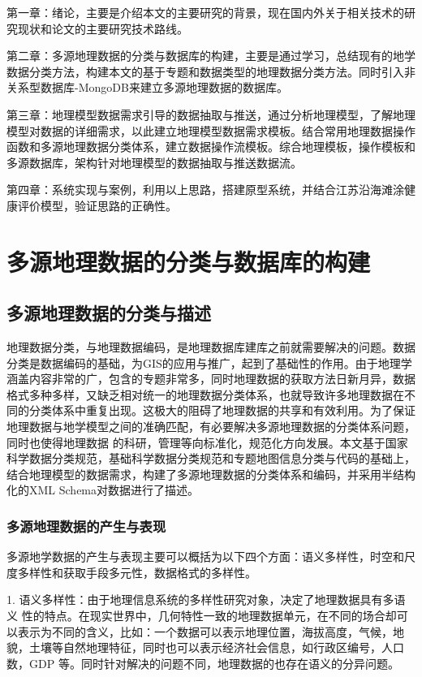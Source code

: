\documentclass[master]{njnuthesis}
\begin{document}
第一章：绪论，主要是介绍本文的主要研究的背景，现在国内外关于相关技术的研究现状和论文的主要研究技术路线。

第二章：多源地理数据的分类与数据库的构建，主要是通过学习，总结现有的地学数据分类方法，构建本文的基于专题和数据类型的地理数据分类方法。同时引入非关系型数据库-MongoDB来建立多源地理数据的数据库。

第三章：地理模型数据需求引导的数据抽取与推送，通过分析地理模型，了解地理模型对数据的详细需求，以此建立地理模型数据需求模板。结合常用地理数据操作函数和多源地理数据分类体系，建立数据操作流模板。综合地理模板，操作模板和多源数据库，架构针对地理模型的数据抽取与推送数据流。

第四章：系统实现与案例，利用以上思路，搭建原型系统，并结合江苏沿海滩涂健康评价模型，验证思路的正确性。


\chapter{多源地理数据的分类与数据库的构建}
\section{多源地理数据的分类与描述}
地理数据分类，与地理数据编码，是地理数据库建库之前就需要解决的问题。数据分类是数据编码的基础，为GIS的应用与推广，起到了基础性的作用。由于地理学涵盖内容非常的广，包含的专题非常多，同时地理数据的获取方法日新月异，数据格式多种多样，又缺乏相对统一的地理数据分类体系，也就导致许多地理数据在不同的分类体系中重复出现。这极大的阻碍了地理数据的共享和有效利用。为了保证地理数据与地学模型之间的准确匹配，有必要解决多源地理数据的分类体系问题，同时也使得地理数据 的科研，管理等向标准化，规范化方向发展。本文基于国家科学数据分类规范，基础科学数据分类规范和专题地图信息分类与代码的基础上，结合地理模型的数据需求，构建了多源地理数据的分类体系和编码，并采用半结构化的XML Schema对数据进行了描述。

\subsection{多源地理数据的产生与表现}
多源地学数据的产生与表现主要可以概括为以下四个方面：语义多样性，时空和尺度多样性和获取手段多元性，数据格式的多样性。

1. 语义多样性：由于地理信息系统的多样性研究对象，决定了地理数据具有多语义
性的特点。在现实世界中，几何特性一致的地理数据单元，在不同的场合却可以表示为不同的含义，比如：一个数据可以表示地理位置，海拔高度，气候，地貌，土壤等自然地理特征，同时也可以表示经济社会信息，如行政区编号，人口数，GDP 等。同时针对解决的问题不同，地理数据的也存在语义的分异问题。
\end{document}
